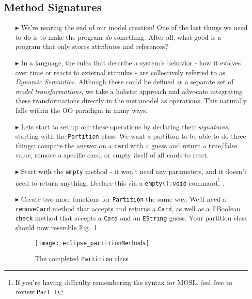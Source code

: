 \newpage
\subsection{Method Signatures}
\texHeader
\hypertarget{static:methods tex}{}

\begin{itemize}
  
\item[$\blacktriangleright$] We're nearing the end of our model creation! One of the last things we need to do is to make the program \emph{do} something. After
all, what good is a program that only stores attributes and references?

\item[$\blacktriangleright$] In a language, the rules that describe a system's behavior - how it evolves over time or reacts to external stimulus - are
collectively referred to as \emph{Dynamic Semantics}. Although these could be defined as a separate set of \emph{model
transformations}, we take a holistic approach and advocate integrating these transformations directly in the metamodel as operations. This naturally falls
within the OO paradigm in many ways.

\item[$\blacktriangleright$] Lets start to set up our these operations by declaring their \emph{signatures}, starting with the \texttt{Partition} class. We want
a partition to be able to do three things: compare the answer on a \texttt{card} with a guess and return a true/false value, remove a specific card, or empty
itself of all cards to reset.

\item[$\blacktriangleright$] Start with the \texttt{empty} method - it won't need any parameters, and it doesn't need to return anything. Declare this via a
\texttt{empty():void} command\footnote{If you're having difficulty remembering the syntax for MOSL, feel free to review \mbox{\texttt{Part I}}} .

\item[$\blacktriangleright$] Create two more functions for \texttt{Partition} the same way. We'll need a \texttt{removeCard} method that accepts and returns a
\texttt{Card}, as well as a EBoolean \texttt{check} method that accepts a \texttt{Card} and an \texttt{EString} guess. Your partition class should now resemble
Fig.~\ref{fig:partitionMethods}.

\begin{figure}[htbp]
	\centering
  \texttt{[image: eclipse\_partitionMethods]}
	\caption{The completed \texttt{Partition} class}
	\label{fig:partitionMethods}
\end{figure}


\end{itemize}
